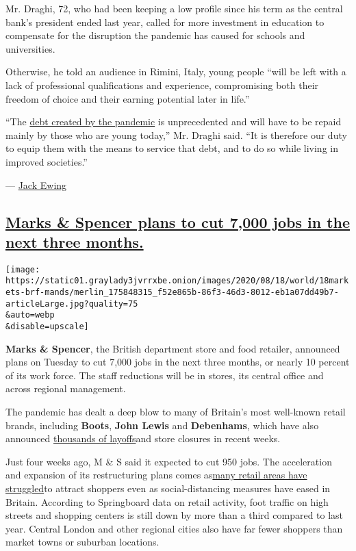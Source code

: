Mr. Draghi, 72, who had been keeping a low profile since his term as the
central bank's president ended last year, called for more investment in
education to compensate for the disruption the pandemic has caused for
schools and universities.

Otherwise, he told an audience in Rimini, Italy, young people ``will be
left with a lack of professional qualifications and experience,
compromising both their freedom of choice and their earning potential
later in life.''

``The
\href{https://www.nytimes3xbfgragh.onion/2020/06/04/business/europe-coronavirus-economic-support.html}{debt
created by the pandemic} is unprecedented and will have to be repaid
mainly by those who are young today,'' Mr. Draghi said. ``It is
therefore our duty to equip them with the means to service that debt,
and to do so while living in improved societies.''

--- \href{https://www.nytimes3xbfgragh.onion/by/jack-ewing}{Jack Ewing}

\hypertarget{marks--spencer-plans-to-cut-7000-jobs-in-the-next-three-months}{%
\subsection{\texorpdfstring{\protect\hyperlink{marks-spencer-plans-to-cut-7000-jobs-in-the-next-three-months}{Marks
\& Spencer plans to cut 7,000 jobs in the next three
months.}}{Marks \& Spencer plans to cut 7,000 jobs in the next three months.}}\label{marks--spencer-plans-to-cut-7000-jobs-in-the-next-three-months}}

\texttt{[image: https://static01.graylady3jvrrxbe.onion/images/2020/08/18/world/18markets-brf-mands/merlin\_175848315\_f52e865b-86f3-46d3-8012-eb1a07dd49b7-articleLarge.jpg?quality=75\\\&auto=webp\\\&disable=upscale]}

\textbf{Marks \& Spencer}, the British department store and food
retailer, announced plans on Tuesday to cut 7,000 jobs in the next three
months, or nearly 10 percent of its work force. The staff reductions
will be in stores, its central office and across regional management.

The pandemic has dealt a deep blow to many of Britain's most well-known
retail brands, including \textbf{Boots}, \textbf{John Lewis} and
\textbf{Debenhams}, which have also announced
\href{https://www.bbc.co.uk/news/business-53348519}{thousands of
layoffs}and store closures in recent weeks.

Just four weeks ago, M \& S said it expected to cut 950 jobs. The
acceleration and expansion of its restructuring plans comes
as\href{https://www.nytimes3xbfgragh.onion/2020/07/31/business/britain-economic-comeback-suburbs.html}{many
retail areas have struggled}to attract shoppers even as
social-distancing measures have eased in Britain. According to
Springboard data on retail activity, foot traffic on high streets and
shopping centers is still down by more than a third compared to last
year. Central London and other regional cities also have far fewer
shoppers than market towns or suburban locations.

